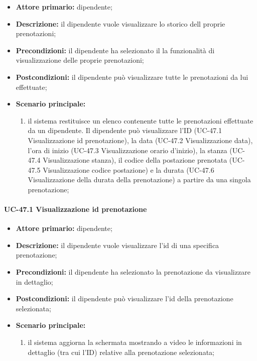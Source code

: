     \begin{itemize}
        \item \textbf{Attore primario:} dipendente;

        \item \textbf{Descrizione:} il dipendente vuole visualizzare lo storico dell proprie prenotazioni;

        \item \textbf{Precondizioni:} il dipendente ha selezionato il la funzionalità di visualizzazione delle proprie prenotazioni;

        \item \textbf{Postcondizioni:} il dipendente può visualizzare tutte le prenotazioni da lui effettuate;

        \item \textbf{Scenario principale:}
            \begin{enumerate}
                 \item il sistema restituisce un elenco contenente tutte le prenotazioni effettuate da un dipendente. Il dipendente può visualizzare l'ID (UC-47.1 Visualizzazione id prenotazione), la data (UC-47.2 Visualizzazione data), l'ora di inizio (UC-47.3 Visualizzazione orario d'inizio), la stanza (UC-47.4 Visualizzazione stanza), il codice della postazione prenotata (UC-47.5 Visualizzazione codice postazione) e la durata (UC-47.6 Visualizzazione della durata della prenotazione) a partire da una singola prenotazione;
            \end{enumerate}
    \end{itemize}


\paragraph{UC-47.1 Visualizzazione id prenotazione}
    
    \begin{itemize}
        \item \textbf{Attore primario:} dipendente;

        \item \textbf{Descrizione:} il dipendente vuole visualizzare l'id di una specifica prenotazione;

        \item \textbf{Precondizioni:} il dipendente ha selezionato la prenotazione da visualizzare in dettaglio;

        \item \textbf{Postcondizioni:} il dipendente può visualizzare l'id della prenotazione selezionata;

        \item \textbf{Scenario principale:}
            \begin{enumerate}
                 \item il sistema aggiorna la schermata mostrando a video le informazioni in dettaglio (tra cui l'ID) relative alla prenotazione selezionata;
            \end{enumerate}
    \end{itemize}

